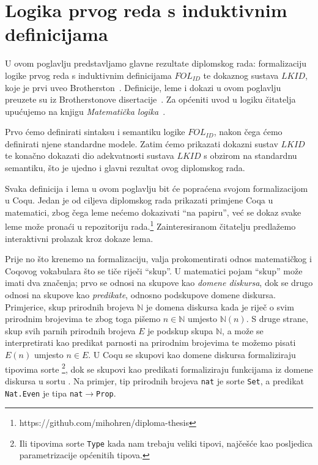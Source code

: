 \chapter{Logika prvog reda s induktivnim definicijama}\label{cha:logika-prvog-reda}
U ovom poglavlju predstavljamo glavne rezultate diplomskog rada: formalizaciju
logike prvog reda s induktivnim definicijama \(\mathit{FOL_{ID}}\)
te dokaznog sustava \(\mathit{LKID}\), koje je prvi uveo Brotherston~\cite{brotherston2005}.
Definicije, leme i dokazi u ovom poglavlju preuzete su iz Brotherstonove disertacije~\cite{brotherstonphd}.
Za općeniti uvod u logiku čitatelja upućujemo na knjigu \textit{Matematička logika}~\cite{vukovic}.

Prvo ćemo definirati sintaksu i semantiku logike \(\mathit{FOL_{ID}}\),
nakon čega ćemo definirati njene standardne modele.
Zatim ćemo prikazati dokazni sustav \(\mathit{LKID}\) te konačno dokazati dio adekvatnosti
sustava \(LKID\) s obzirom na standardnu semantiku,
što je ujedno i glavni rezultat ovog diplomskog rada.

Svaka definicija i lema u ovom poglavlju bit će popraćena svojom formalizacijom u Coqu.
Jedan je od ciljeva diplomskog rada prikazati primjene Coqa u matematici,
zbog čega leme nećemo dokazivati \enquote{na papiru},
već se dokaz svake leme može pronaći u repozitoriju rada.\footnote{https://github.com/mihohren/diploma-thesis}
Zainteresiranom čitatelju predlažemo interaktivni prolazak kroz dokaze lema.

Prije no što krenemo na formalizaciju, valja prokomentirati odnos matematičkog i Coqovog vokabulara
što se tiče riječi \enquote{skup}.
U matematici pojam \enquote{skup} može imati dva značenja;
prvo se odnosi na skupove kao \textit{domene diskursa},
dok se drugo odnosi na skupove kao \textit{predikate}, odnosno podskupove domene diskursa.
Primjerice, skup prirodnih brojeva \(\mathbb{N}\) je domena diskursa kada je riječ o svim prirodnim brojevima
te zbog toga pišemo \(n \in \mathbb{N}\) umjesto \(\mathbb{N}(n)\).
S druge strane, skup svih parnih prirodnih brojeva \(E\) je podskup skupa \(\mathbb{N}\), a može se interpretirati
kao predikat parnosti na prirodnim brojevima te možemo pisati \(E(n)\) umjesto \(n \in E\).
U Coqu se skupovi kao domene diskursa formaliziraju tipovima sorte \coqset\footnote{Ili tipovima sorte \texttt{Type}
kada nam trebaju veliki tipovi, najčešće kao posljedica parametrizacije općenitih tipova.},
dok se skupovi kao predikati formaliziraju funkcijama iz domene diskursa u sortu \coqprop.
Na primjer, tip prirodnih brojeva \texttt{nat} je sorte \texttt{Set}, a predikat \texttt{Nat.Even} je tipa \texttt{nat\(\rightarrow\)Prop}.

